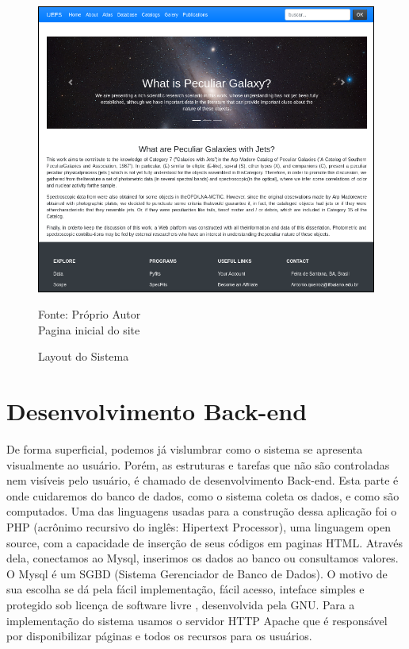 \begin{figure}[H]
	\centering	
    \caption{Layout do Sistema}
    \includegraphics[width=1.0\textwidth]{figuras/site-latex-final.png}
   	\begin{center}
        \normalsize Fonte: Próprio Autor \\Pagina inicial do site
    \end{center}
	\label{fig:sbmt-moses}
\end{figure}

\section{Desenvolvimento Back-end}

De forma superficial, podemos já vislumbrar como o sistema se apresenta visualmente ao usuário. Porém, as estruturas e tarefas que não são controladas nem visíveis pelo usuário, é chamado de desenvolvimento Back-end. Esta parte é onde cuidaremos do banco de dados, como o sistema coleta os dados, e como são computados. 
Uma das linguagens usadas para a construção dessa aplicação foi o PHP (acrônimo recursivo do inglês: Hipertext Processor), uma linguagem open source, com a capacidade de inserção de seus códigos em paginas HTML. Através dela, conectamos ao Mysql, inserimos os dados ao banco ou consultamos valores. O Mysql é um SGBD (Sistema Gerenciador de Banco de Dados). O motivo de sua escolha se dá pela fácil implementação, fácil acesso, inteface simples e protegido sob licença de software livre , desenvolvida pela GNU. 
Para a implementação do sistema usamos o servidor HTTP Apache que é responsável por disponibilizar páginas e todos os recursos para os usuários. 

